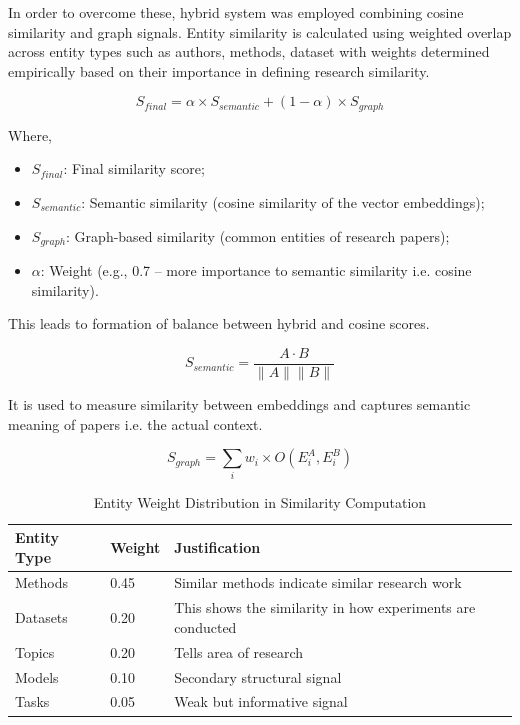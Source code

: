 \documentclass[10pt]{article}
\begin{document}
In order to overcome these, hybrid system was employed combining cosine similarity and graph signals. Entity similarity is calculated using weighted overlap across entity types such as authors, methods, dataset with weights determined empirically based on their importance in defining research similarity.

\begin{equation}
S_{final}=\alpha \times S_{semantic}+(1-\alpha)\times S_{graph}
\end{equation}

Where,
\begin{itemize}[leftmargin=*,noitemsep]
\item $S_{final}$: Final similarity score;
\item $S_{semantic}$: Semantic similarity (cosine similarity of the vector embeddings);
\item $S_{graph}$: Graph-based similarity (common entities of research papers);
\item $\alpha$: Weight (e.g., 0.7 -- more importance to semantic similarity i.e. cosine similarity).
\end{itemize}

This leads to formation of balance between hybrid and cosine scores.

\begin{equation}
S_{semantic}=\frac{A\cdot B}{\lVert A\rVert\lVert B\rVert}
\end{equation}

It is used to measure similarity between embeddings and captures semantic meaning of papers i.e. the actual context.

\begin{equation}
S_{graph}=\sum_i w_i \times O(E_i^A,E_i^B)
\end{equation}

\begin{table}[htbp]
\centering
\caption{Entity Weight Distribution in Similarity Computation}
\label{tab:entity-weights}
\begin{tabularx}{\linewidth}{P{3.0cm} P{2.0cm} Y}
\toprule
\textbf{Entity Type} & \textbf{Weight} & \textbf{Justification}\\
\midrule
Methods & 0.45 & Similar methods indicate similar research work\\
Datasets & 0.20 & This shows the similarity in how experiments are conducted\\
Topics & 0.20 & Tells area of research\\
Models & 0.10 & Secondary structural signal\\
Tasks & 0.05 & Weak but informative signal\\
\bottomrule
\end{tabularx}
\end{table}
\end{document}
